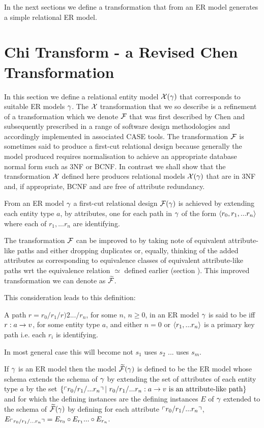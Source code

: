 In the next sections we define a transformation that from an ER model generates a simple relational ER model.

\section{Chi Transform - a Revised Chen Transformation}
In this section we define a relational  entity model $\mathcal{X}(\gamma)$ that corresponds
to suitable ER models $\gamma$. The $\mathcal{X}$ transformation that we so describe is a refinement
of a transformation which we denote $\mathcal{F}$ that was first described by Chen and subsequently prescribed in a range of software design methodologies and accordingly implemented in associated CASE tools. The transformation $\mathcal{F}$ is sometimes said to produce a first-cut relational design because generally the model produced requires normalisation
to achieve an appropriate database normal form such as 3NF or BCNF. 
In contrast we shall show that the transformation $\mathcal{X}$ defined here produces relational models $\mathcal{X}(\gamma)$ that are in 3NF and, if appropriate, BCNF and are free of attribute redundancy.

From an ER model $\gamma$ a first-cut relational design $\mathcal{F}(\gamma)$ is achieved by extending each
entity type $a$, by attributes,  one for each path in $\gamma$ of the 
form $\langle r_0,r_1,...r_n\rangle$ where each of $r_1,...r_n$ are identifying. 

The transformation $\mathcal{F}$ can be improved to by taking note of equivalent attribute-like paths and
either dropping duplicates or, equally, thinking of the added attributes as corresponding to equivalence classes of 
equivalent attribute-like paths wrt the equivalence relation $\simeq$ defined earlier (section ). This improved transformation we can denote as $\mathcal{\widetilde{F}}$.

This consideration leads  to this definition:
\begin{definition}
A path $r=r_0/r_1/r)2.../r_n$, for some $n$, $n \geq 0$, in an ER model $\gamma$ is 
said to be  iff $r: a \rightarrow v$, for some entity type $a$,
and either $n=0$ or $\langle r_1,...r_n\rangle$ is a primary key path i.e. each $r_i$ is identifying.
\end{definition}
\begin{noteforfuture}
In most general case this will become not $s_1$ uses $s_2$ ... uses $s_m$.
\end{noteforfuture}
If $\gamma$ is an ER model then the model $\mathcal{\widetilde{F}}(\gamma)$ is defined to be the ER model whose schema extends the schema of $\gamma$
by extending the set of attributes of each entity type $a$ by the set 
$\set{\qq{r_0/r_1/...r_n}  | \ r_0/r_1/...r_n: a \morph \veee \mbox{ is an attribute-like path}}$ and for which the defining instances are the defining  instances $E$ of $\gamma$ extended to the schema of $\mathcal{\widetilde{F}}(\gamma)$ by defining for each attribute $\left\ulcorner r_0/r_1/...r_n\right\urcorner$, $E_{\left\ulcorner r_0/r_1/...r_n\right\urcorner} = E_{r_0} \circ E_{r_1}... \circ E_{r_n}$.

